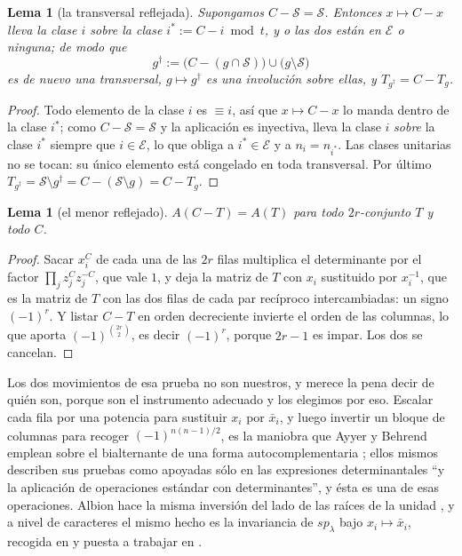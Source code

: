 \documentclass[11pt,reqno]{amsart}
\theoremstyle{plain}
\newtheorem{lemma}[theorem]{Lema}
\theoremstyle{definition}
\begin{document}
\begin{lemma}[la transversal reflejada]\label{lem:reflact}
Supongamos $C-\mathcal{S}=\mathcal{S}$. Entonces $x\mapsto C-x$ lleva la clase $i$ sobre la clase
$i^{*}:=C-i \bmod t$, y o las dos están en $\mathcal{E}$ o ninguna; de modo que
\[
g^{\dagger}:=\bigl(C-(g\cap\mathcal{S})\bigr)\cup\bigl(g\setminus\mathcal{S}\bigr)
\]
es de nuevo una transversal, $g\mapsto g^{\dagger}$ es una involución sobre ellas, y
$T_{g^{\dagger}}=C-T_g$.
\end{lemma}

\begin{proof}
Todo elemento de la clase $i$ es $\equiv i$, así que $x\mapsto C-x$ lo manda dentro de la clase
$i^{*}$; como $C-\mathcal{S}=\mathcal{S}$ y la aplicación es inyectiva, lleva la clase $i$
\emph{sobre} la clase $i^{*}$ siempre que $i\in\mathcal{E}$, lo que obliga a $i^{*}\in\mathcal{E}$ y a
$n_i=n_{i^{*}}$. Las clases unitarias no se tocan: su único elemento está congelado en toda
transversal. Por último $T_{g^{\dagger}}=\mathcal{S}\setminus g^{\dagger}=C-(\mathcal{S}\setminus
g)=C-T_g$.
\end{proof}

\begin{lemma}[el menor reflejado]\label{lem:Arefl}
$A(C-T)=A(T)$ para todo $2r$-conjunto $T$ y todo $C$.
\end{lemma}

\begin{proof}
Sacar $x_i^{C}$ de cada una de las $2r$ filas multiplica el determinante por el factor
$\prod_j z_j^{C}z_j^{-C}$, que vale $1$, y deja la matriz de $T$ con $x_i$ sustituido por
$x_i^{-1}$, que es la
matriz de $T$ con las dos filas de cada par recíproco intercambiadas: un signo $(-1)^{r}$.
Y listar $C-T$ en orden decreciente invierte el orden de las columnas, lo que aporta
$(-1)^{\binom{2r}{2}}$, es decir $(-1)^{r}$, porque $2r-1$ es impar. Los dos se cancelan.
\end{proof}

\noindent Los dos movimientos de esa prueba no son nuestros, y merece la pena decir de quién son,
porque son el instrumento adecuado y los elegimos por eso. Escalar cada fila por una potencia para
sustituir $x_i$ por $\bar x_i$, y luego invertir un bloque de columnas para recoger
$(-1)^{n(n-1)/2}$, es la maniobra que Ayyer y Behrend emplean sobre el bialternante de una forma
autocomplementaria \cite[\S3]{AB19}; ellos mismos describen sus pruebas como apoyadas sólo en las
expresiones determinantales ``y la aplicación de operaciones estándar con determinantes'', y ésta es
una de esas operaciones. Albion hace la misma inversión del lado de las raíces de la unidad
\cite{Alb23,Alb25}, y a nivel de caracteres el mismo hecho es la invariancia de $sp_\lambda$ bajo
$x_i\mapsto\bar x_i$, recogida en \cite{AB19} y puesta a trabajar en \cite{AF20}.
\end{document}
